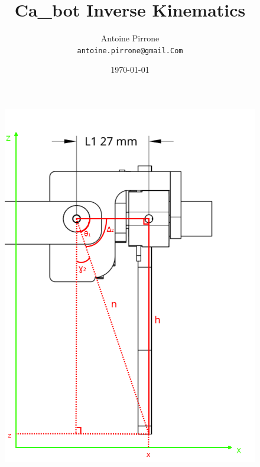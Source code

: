\documentclass[12pt,fleqn,leqno,letterpaper]{article}
\title{Ca\_bot Inverse Kinematics}
\author{Antoine Pirrone\\
  \small{\texttt{antoine.pirrone@gmail.Com}}
}
\date{\today}
\begin{document}
\maketitle

\begin{figure}[h]  
  \includegraphics[scale=0.35]{assets/front_annotated.png}

\end{figure}
\end{document}
